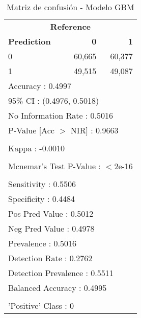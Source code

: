 \begin{table}[htbp]
\centering
\caption{Matriz de confusión - Modelo GBM}
\label{tab:15_matriz_gbm}
\begin{tabular}{lrr}
\toprule
\multicolumn{3}{c}{\textbf{Reference}} \\
\textbf{Prediction} & \textbf{0} & \textbf{1} \\
\midrule
0 & 60,665 & 60,377 \\
1 & 49,515 & 49,087 \\
\midrule
\multicolumn{3}{l}{Accuracy : 0.4997} \\
\multicolumn{3}{l}{95\% CI : (0.4976, 0.5018)} \\
\multicolumn{3}{l}{No Information Rate : 0.5016} \\
\multicolumn{3}{l}{P-Value [Acc $>$ NIR] : 0.9663} \\
\\
\multicolumn{3}{l}{Kappa : -0.0010} \\
\\
\multicolumn{3}{l}{Mcnemar's Test P-Value : $<$2e-16} \\
\\
\multicolumn{3}{l}{Sensitivity : 0.5506} \\
\multicolumn{3}{l}{Specificity : 0.4484} \\
\multicolumn{3}{l}{Pos Pred Value : 0.5012} \\
\multicolumn{3}{l}{Neg Pred Value : 0.4978} \\
\multicolumn{3}{l}{Prevalence : 0.5016} \\
\multicolumn{3}{l}{Detection Rate : 0.2762} \\
\multicolumn{3}{l}{Detection Prevalence : 0.5511} \\
\multicolumn{3}{l}{Balanced Accuracy : 0.4995} \\
\\
\multicolumn{3}{l}{'Positive' Class : 0} \\
\bottomrule
\end{tabular}
\end{table}